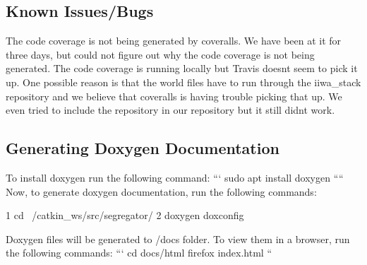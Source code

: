 \subsection*{Known Issues/\+Bugs}

The code coverage is not being generated by coveralls. We have been at it for three days, but could not figure out why the code coverage is not being generated. The code coverage is running locally but Travis doesn\textquotesingle{}t seem to pick it up. One possible reason is that the world files have to run through the iiwa\+\_\+stack repository and we believe that coveralls is having trouble picking that up. We even tried to include the repository in our repository but it still didn\textquotesingle{}t work.

\subsection*{Generating Doxygen Documentation}

To install doxygen run the following command\+: ``` sudo apt install doxygen ```` Now, to generate doxygen documentation, run the following commands\+: 
\begin{DoxyCode}
1 cd ~/catkin\_ws/src/segregator/
2 doxygen doxconfig
\end{DoxyCode}
 Doxygen files will be generated to /docs folder. To view them in a browser, run the following commands\+: ``` cd docs/html firefox index.\+html `` 